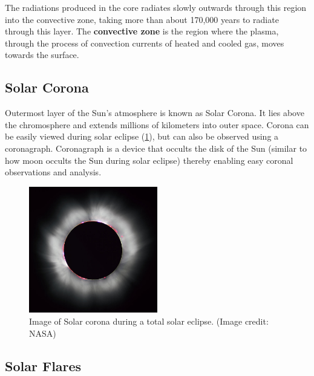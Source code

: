 The radiations produced in the core radiates slowly outwards through this region into the convective zone, taking more than about 170,000 years to radiate through this layer. The \textbf{convective zone} is the region where the plasma, through the process of convection currents of heated and cooled gas, moves towards the surface.



\subsection{Solar Corona}

Outermost layer of the Sun's atmosphere is known as Solar Corona. It lies above the chromosphere and extends millions of kilometers into outer space. Corona can be easily viewed during solar eclipse (\cref{fig:corona_eclipse}), but can also be observed using a coronagraph. Coronagraph is a device that occults the disk of the Sun (similar to how moon occults the Sun during solar eclipse) thereby enabling easy coronal observations and analysis.

\begin{figure}[h!]
    \centering
    \includegraphics[width=0.5\textwidth]{images/corona.jpg}
    \caption[Image of Solar corona during a total solar eclipse]{Image of Solar corona during a total solar eclipse. (Image credit: NASA)}
    \label{fig:corona_eclipse}
\end{figure}


\subsection{Solar Flares}

